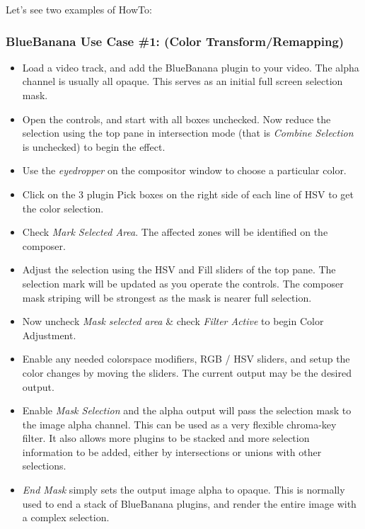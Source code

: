 Let's see two examples of HowTo:

\subsubsection*{BlueBanana Use Case \#1: (Color Transform/Remapping)}
\label{ssub:bb_use_case_1}

\begin{itemize}
        \item Load a video track, and add the BlueBanana plugin to your video. The alpha channel is usually all opaque. This serves as an initial full screen selection mask.
        \item Open the controls, and start with all boxes unchecked. Now reduce the selection using the top pane in intersection mode (that is \textit{Combine Selection} is unchecked) to begin the effect.
        \item Use the \textit{eyedropper} on the compositor window to choose a particular color.
        \item Click on the 3 plugin Pick boxes on the right side of each line of HSV to get the color selection.
        \item Check \textit{Mark Selected Area}. The affected zones will be identified on the composer.
        \item Adjust the selection using the HSV and Fill sliders of the top pane. The selection mark will be updated as you operate the controls. The composer mask striping will be strongest as the mask is nearer full selection.
        \item Now uncheck \textit{Mask selected area} \& check \textit{Filter Active} to begin Color Adjustment.
        \item Enable any needed colorspace modifiers, RGB / HSV sliders, and setup the color changes by moving the sliders. The current output may be the desired output.
        \item Enable \textit{Mask Selection} and the alpha output will pass the selection mask to the image alpha channel. This can be used as a very flexible chroma-key filter. It also allows more plugins to be stacked and more selection information to be added, either by intersections or unions with other selections.
        \item \textit{End Mask} simply sets the output image alpha to opaque. This is normally used to end a stack of BlueBanana plugins, and render the entire image with a complex selection.
\end{itemize}

